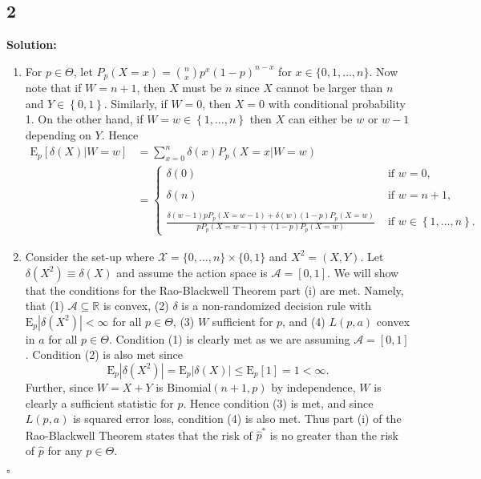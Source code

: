 \documentclass[12pt]{article}
\newcounter{ProofCounter}
\newenvironment{Solution}{\stepcounter{ProofCounter}\textbf{Solution:}}{\hfill$\square$}
\newcommand{\E}{\mathrm{E}}
\begin{document}
\subsection*{2}
\begin{Solution}
  \begin{enumerate}[label=(\alph*),leftmargin=*]
    \item For $p \in \Theta$, let $P_{p}(X = x) = \binom{n}{x} p^x(1-p)^{n-x}$ for $x \in \{0, 1, \dots, n\}$. Now note that if $W = n + 1$, then $X$
      must be $n$ since $X$ cannot be larger than $n$ and $Y \in \left\{ 0,1 \right\}$. Similarly, if $W = 0$, then $X = 0$ with conditional
      probability 1. On the other hand, if $W = w \in \left\{ 1,\dots, n \right\}$ then $X$ can either be $w$ or $w - 1$ depending on $Y$. Hence 
      \begin{align*}
        \E_{p}[\delta(X) | W=w] & = \sum_{x=0}^{n}\delta(x)P_{p}(X = x|W = w) \\
        & = \left\{ \begin{array}{ll} 
            \delta(0) & \text{ if } w = 0, \\
            \\
            \delta(n) & \text{ if } w = n + 1, \\
            \\
            \frac{\delta(w-1)pP_{p}(X = w-1) + \delta(w)(1-p)P_{p}(X = w)}{pP_{p}(X = w-1) + (1-p)P_p(X = w)} & \text{ if } w \in \left\{ 1, \dots, n
            \right\}.
        \end{array} \right.
      \end{align*}

    \item Consider the set-up where $\mathcal{X} = \{0, \dots, n\} \times \{0, 1\}$ and $X^2 = (X, Y)$. Let $\delta(X^2) \equiv \delta(X)$ and assume the
      action space is $\mathcal{A} = [0,1]$.
      We will show that the conditions for the Rao-Blackwell Theorem part (i) are met. Namely, that (1) $\mathcal{A} \subseteq \mathbb{R}$ is
      convex, (2) $\delta$ is a non-randomized decision rule with $\E_p|\delta(X^2)| < \infty$ for all $p \in \Theta$, (3) $W$ sufficient for $p$, and
      (4) $L(p, a)$ convex in $a$ for all $p \in \Theta$.
      Condition (1) is clearly met as we are assuming $\mathcal{A} = [0,1]$. Condition (2) is also met since 
      \[
        \E_{p}|\delta(X^2)| = \E_{p}|\delta(X)| \leq \E_{p}[1] = 1 < \infty.
      \]
      Further, since $W = X + Y$ is Binomial$(n + 1, p)$ by independence, $W$ is clearly a sufficient statistic for $p$. Hence condition (3) is
      met, and since $L(p,a)$ is squared error loss, condition (4) is also met. Thus part (i) of the Rao-Blackwell Theorem states that the risk of
      $\hat{p}^*$ is no greater than the risk of $\hat{p}$ for any $p \in \Theta$.


\end{enumerate}
\end{Solution}
\end{document}

